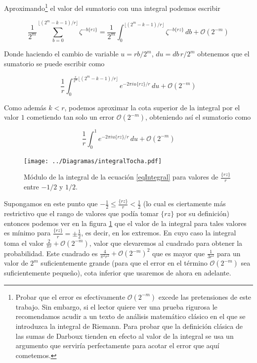 \documentclass[11pt, spanish]{report}
\numberwithin{equation}{section}
\numberwithin{defin}{section}
\begin{document}
Aproximando\footnote{Probar que el error es efectivamente $\mathcal{O}(2^{-m})$ excede las pretensiones de este trabajo. Sin embargo, si el lector quiere ver una prueba rigurosa le recomendamos acudir a un texto de análisis matemático clásico en el que se introduzca la integral de Riemann. Para probar que la definición clásica de las sumas de Darboux tienden en efecto al valor de la integral se usa un argumento que serviría perfectamente para acotar el error que aquí cometemos.} el valor del sumatorio con una integral podemos escribir

\begin{equation}
\frac{1}{2^m}\sum_{b=0}^{\lfloor (2^m-k-1)/r \rfloor}\zeta^{-b\{rz\}}=\frac{1}{2^m}\int_{0}^{\lfloor (2^m-k-1)/r \rfloor}\zeta^{-b\{rz\}}\,db+\mathcal{O}(2^{-m})
\end{equation}

Donde haciendo el cambio de variable $u=rb/2^m$, $du=db\,r/2^m$ obtenemos que el sumatorio se puede escribir como

\begin{equation}
\frac{1}{r}\int_{0}^{\frac{r}{2^m}\lfloor (2^m-k-1)/r \rfloor}e^{-2\pi i u \{rz\}/r}\,du+\mathcal{O}(2^{-m})
\end{equation}

Como además $k<r$, podemos aproximar la cota superior de la integral por el valor $1$ cometiendo\footnotemark{} tan solo un error $\mathcal{O}(2^{-m})$, obteniendo así el sumatorio como



\begin{equation}\label{eqIntegral}
\frac{1}{r}\int_{0}^1e^{-2\pi i u \{rz\}/r}\,du+\mathcal{O}(2^{-m})
\end{equation}

\begin{figure}
\begin{center}
\texttt{[image: ../Diagramas/integralTocha.pdf]}
\end{center}
\caption{Módulo de la integral de la ecuación \ref{eqIntegral} para valores de $\frac{\{rz\}}{r}$ entre $-1/2$ y  $1/2$.}\label{IntegralTocha}
\end{figure}

Supongamos en este punto que $-\frac{1}{2}\leq \frac{\{rz\}}{r}<\frac{1}{2}$ (lo cual es ciertamente más restrictivo que el rango de valores que podía tomar $\{rz\}$ por su definición) entonces podemos ver en la figura \ref{IntegralTocha} que el valor de la integral para tales valores es mínimo para $\frac{\{rz\}}{r}=\pm\frac{1}{2}$, es decir, en los extremos\footnotemark{}. En cuyo caso la integral toma el valor $\frac{2}{\pi r}+\mathcal{O}(2^{-m})$, valor que elevaremos al cuadrado para obtener la probabilidad. Este cuadrado es $\frac{4}{\pi^2r^2}+\mathcal{O}(2^{-m})^2$ que es mayor que $\frac{1}{3r^2}$ para un valor de $2^m$ suficientemente grande (para que el error en el término $\mathcal{O}(2^{-m})$ sea suficientemente pequeño), cota inferior que usaremos de ahora en adelante.\\
\end{document}
